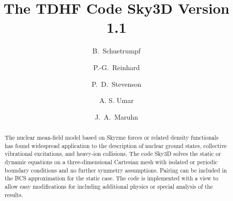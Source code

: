 \documentclass[final,1p,twocolumn]{elsarticle}
\begin{document}
\begin{frontmatter}



\title{The TDHF Code Sky3D Version 1.1} 

\author{B.~Schuetrumpf }
\address{National Superconducting Cyclotron Laboratory\\
Michigan State University, East Lansing, Michigan 48824, USA}

\author{P.-G.~Reinhard}
\address{Institut f\"ur Theoretische Physik II, Universit\"at
  Erlangen-N\"urnberg, \\Staudtstrasse 7, 91058 Erlangen, Germany}

\author{P.~D.~Stevenson}
\address{Department of Physics, University of Surrey, Guildford,
  Surrey, GU2 7XH, United Kingdom}

\author{A. S. Umar}
\address{Department of Physics and Astronomy, Vanderbilt University, \\Nashville, Tennessee 37235, USA}

\author{J.~A.~Maruhn} 
\address{Institut f\"ur Theoretische Physik, Goethe-Universit\"at,
  Max-von-Laue-Str. 1, \\60438 Frankfurt am Main, Germany}


\begin{abstract}
  The nuclear mean-field model based on Skyrme forces or related
  density functionals has found widespread application to the
  description of nuclear ground states, collective vibrational
  excitations, and heavy-ion collisions. The code Sky3D solves the
  static or dynamic equations on a three-dimensional Cartesian mesh
  with isolated or periodic boundary conditions and no further
  symmetry assumptions. Pairing can be included in the BCS
  approximation for the static case. The code is implemented with a
  view to allow easy modifications for including additional physics or
  special analysis of the results.
\end{abstract}


\end{frontmatter}
\end{document}
